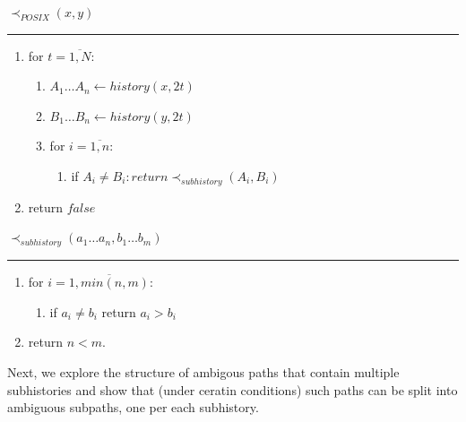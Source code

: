 \documentclass{article}
\newcommand{\Xset}{\!\leftarrow\!}
\newcommand{\Xeq}{\!=\!}
\theoremstyle{definition}
\begin{document}
\begin{multicols}{2}
    $\prec_{POSIX}(x, y)$
    \hrule
    \begin{enumerate}[leftmargin=0in]
        \smallskip
        \item[] for $t \Xeq \overline{1, N}$:
        \begin{enumerate}
            \item[] $A_1 \dots A_n \Xset history(x, 2t)$
            \item[] $B_1 \dots B_n \Xset history(y, 2t)$
            \item[] for $i \Xeq \overline{1, n}$:
            \begin{enumerate}
                \item[] if $A_i \!\neq\! B_i: return \prec_{subhistory} (A_i, B_i)$
            \end{enumerate}
        \end{enumerate}
        \item[] return $false$
        \\
    \end{enumerate}

    \bigskip

    $\prec_{subhistory} (a_1 \dots a_n, b_1 \dots b_m)$
    \hrule
    \begin{enumerate}[leftmargin=0in]
        \smallskip
        \item[] for $i \Xeq \overline{1, min(n, m)}$:
        \begin{enumerate}
            \item[] if $a_i \!\neq\! b_i$ return $a_i \!>\! b_i$
        \end{enumerate}
        \item[] return $n \!<\! m$.
        \\
    \end{enumerate}

    \bigskip

Next, we explore the structure of ambigous paths that contain multiple subhistories
and show that (under ceratin conditions) such paths can be split into ambiguous subpaths,
one per each subhistory.
\\


\end{multicols}
\end{document}
